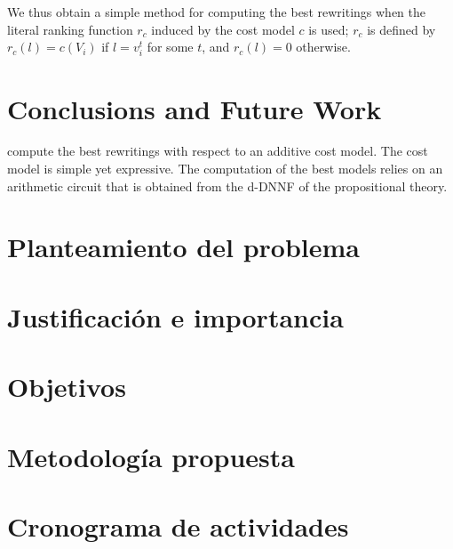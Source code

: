 \documentclass{llncs}
\begin{document}
We thus obtain a simple method for computing the best
rewritings when the literal ranking function $r_c$ induced
by the cost model $c$ is used; $r_c$ is defined by
$r_c(l)=c(V_i)$ if $l=v^t_i$ for some $t$, and $r_c(l)=0$
otherwise.


\section{Conclusions and Future Work}

compute the best rewritings with respect to an additive
cost model. The cost model is simple yet expressive.
The computation of the best models relies on an arithmetic
circuit that is obtained from the d-DNNF of the propositional
theory.







\section{Planteamiento del problema}
\section{Justificación e importancia}
\section{Objetivos}
\section{Metodología propuesta}
\section{Cronograma de actividades}





\end{document}

